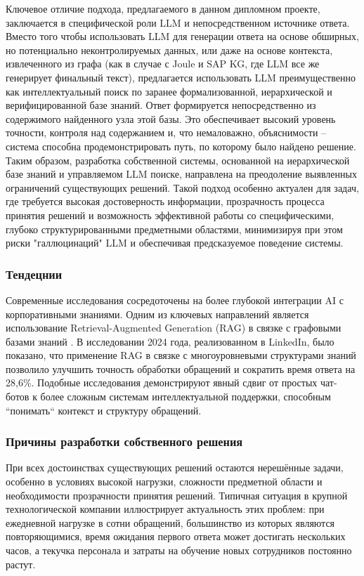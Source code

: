 Ключевое отличие подхода, предлагаемого в данном дипломном проекте, заключается в специфической роли LLM и непосредственном источнике ответа. Вместо того чтобы использовать LLM для генерации ответа на основе обширных, но потенциально неконтролируемых данных, или даже на основе контекста, извлеченного из графа (как в случае с Joule и SAP KG, где LLM все же генерирует финальный текст), предлагается использовать LLM преимущественно как интеллектуальный поиск по заранее формализованной, иерархической и верифицированной базе знаний. Ответ формируется непосредственно из содержимого найденного узла этой базы. Это обеспечивает высокий уровень точности, контроля над содержанием и, что немаловажно, объяснимости – система способна продемонстрировать путь, по которому было найдено решение.
Таким образом, разработка собственной системы, основанной на иерархической базе знаний и управляемом LLM поиске, направлена на преодоление выявленных ограничений существующих решений. Такой подход особенно актуален для задач, где требуется высокая достоверность информации, прозрачность процесса принятия решений и возможность эффективной работы со специфическими, глубоко структурированными предметными областями, минимизируя при этом риски "галлюцинаций" LLM и обеспечивая предсказуемое поведение системы.

\subsubsection{Тендецнии}

Современные исследования сосредоточены на более глубокой интеграции AI с корпоративными знаниями. Одним из ключевых направлений является использование Retrieval-Augmented Generation (RAG) в связке с графовыми базами знаний \cite{arxiv}. В исследовании 2024 года, реализованном в LinkedIn, было показано, что применение RAG в связке с многоуровневыми структурами знаний позволило улучшить точность обработки обращений и сократить время ответа на 28,6\%. Подобные исследования демонстрируют явный сдвиг от простых чат-ботов к более сложным системам интеллектуальной поддержки, способным ``понимать`` контекст и структуру обращений.

\subsubsection{Причины разработки собственного решения}

При всех достоинствах существующих решений остаются нерешённые задачи, особенно в условиях высокой нагрузки, сложности предметной области и необходимости прозрачности принятия решений. Типичная ситуация в крупной технологической компании иллюстрирует актуальность этих проблем: при ежедневной нагрузке в сотни обращений, большинство из которых являются повторяющимися, время ожидания первого ответа может достигать нескольких часов, а текучка персонала и затраты на обучение новых сотрудников постоянно растут.

